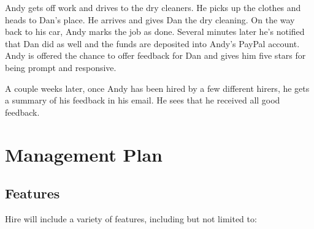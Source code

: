 \documentclass[11pt]{article}
\begin{document}
Andy gets off work and drives to the dry cleaners. He picks up the clothes and heads to Dan's place. He arrives and gives Dan the dry cleaning. On the way back to his car, Andy marks the job as done. Several minutes later he's notified that Dan did as well and the funds are deposited into Andy's PayPal account. Andy is offered the chance to offer feedback for Dan and gives him five stars for being prompt and responsive.

A couple weeks later, once Andy has been hired by a few different hirers, he gets a summary of his feedback in his email. He sees that he received all good feedback. 

%
\section{Management Plan}\label{management-plan}

\subsection{Features}


Hire will include a variety of features, including but not limited to:
\end{document}
